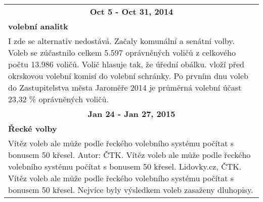 \begin{tabularx}{\linewidth}{l l}
                \multicolumn{2}{c}{\bf Oct 5 - Oct 31, 2014} \\
                \multicolumn{2}{p{\linewidth}}{\bf volební analitk} \\
                \multicolumn{2}{p{\linewidth}}{I zde se alternativ nedostává. Začaly komunální a senátní volby. Voleb se zúčastnilo celkem 5.597 oprávněných voličů z celkového počtu 13.986 voličů. Volič hlasuje tak, že úřední obálku. vloží před okrskovou volební komisí do volební schránky. Po prvním dnu voleb do Zastupitelstva města Jaroměře 2014 je průměrná volební účast 23,32 \% oprávněných voličů.} \\ \midrule
                
                \multicolumn{2}{c}{\bf Jan 24 - Jan 27, 2015} \\
                \multicolumn{2}{p{\linewidth}}{\bf Řecké volby} \\
                \multicolumn{2}{p{\linewidth}}{Vítěz voleb ale může podle řeckého volebního systému počítat s bonusem 50 křesel. Autor: ČTK. Vítěz voleb ale může podle řeckého volebního systému počítat s bonusem 50 křesel. Lidovky.cz, ČTK. Vítěz voleb ale může podle řeckého volebního systému počítat s bonusem 50 křesel. Nejvíce byly výsledkem voleb zasaženy dluhopisy.} \\ \midrule
                [1.5pt]


\end{tabularx}